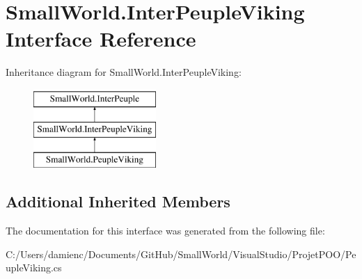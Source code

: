 \hypertarget{interface_small_world_1_1_inter_peuple_viking}{\section{Small\-World.\-Inter\-Peuple\-Viking Interface Reference}
\label{interface_small_world_1_1_inter_peuple_viking}
}
Inheritance diagram for Small\-World.\-Inter\-Peuple\-Viking\-:\begin{figure}[H]
\begin{center}
\leavevmode
\includegraphics[height=3.000000cm]{interface_small_world_1_1_inter_peuple_viking}
\end{center}
\end{figure}
\subsection*{Additional Inherited Members}


The documentation for this interface was generated from the following file\-:\begin{DoxyCompactItemize}
\item 
C\-:/\-Users/damienc/\-Documents/\-Git\-Hub/\-Small\-World/\-Visual\-Studio/\-Projet\-P\-O\-O/Peuple\-Viking.\-cs\end{DoxyCompactItemize}
